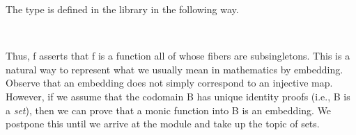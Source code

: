 The  type is defined in the \typetopology library in the following way.
\ccpad
\begin{code}%
\>[1]\AgdaSpace{}%
\AgdaSymbol{:}\AgdaSpace{}%
\AgdaSymbol{(}\AgdaSpace{}%
\AgdaSpace{}%
\AgdaSymbol{)}\AgdaSpace{}%
\AgdaSpace{}%
\AgdaSpace{}%
\AgdaSpace{}%
\AgdaSpace{}%
\<%
\\
%
\>[1]\AgdaSpace{}%
\AgdaSpace{}%
\AgdaSymbol{=}\AgdaSpace{}%
\AgdaSpace{}%
\AgdaSpace{}%
\AgdaSpace{}%
\AgdaSpace{}%
\AgdaSymbol{(}\AgdaSpace{}%
\AgdaSpace{}%
\AgdaSymbol{)}\<%
\end{code}
\ccpad
Thus,  \ab f asserts that \ab f is a function all of whose fibers are subsingletons. This is a natural way to represent what we usually mean in mathematics by embedding. Observe that an embedding does not simply correspond to an injective map. However, if we assume that the codomain \ab B has unique identity proofs (i.e., \ab B is a \emph{set}), then we can prove that a monic function into \ab B is an embedding. We postpone this until we arrive at the  module and take up the topic of sets.

